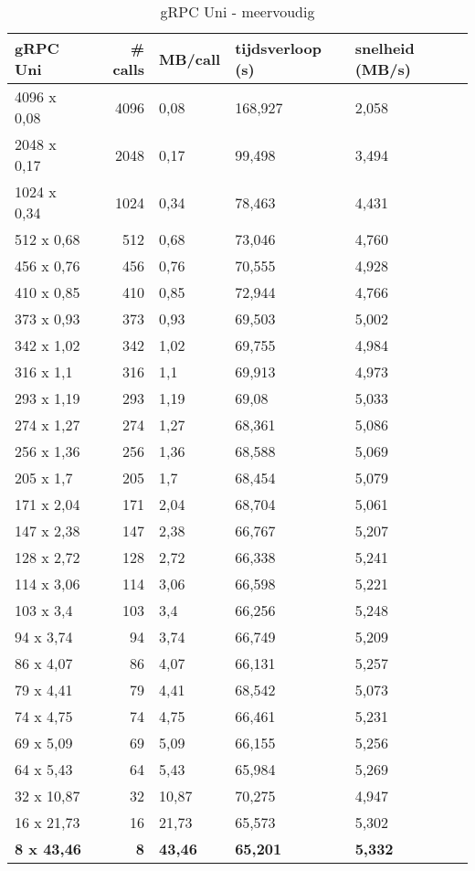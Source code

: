\begin{table}
    \centering
    \begin{tabular}{lrlll}
        \toprule
        \textbf{gRPC Uni} & \textbf{\# calls} & \textbf{MB/call} & \textbf{tijdsverloop (s)} & \textbf{snelheid (MB/s)} \\
        \midrule
        4096 x 0,08 & 4096 & 0,08 & 168,927 & 2,058 \\
        2048 x 0,17 & 2048 & 0,17 & 99,498 & 3,494 \\
        1024 x 0,34 & 1024 & 0,34 & 78,463 & 4,431 \\
        512 x 0,68 & 512 & 0,68 & 73,046 & 4,760 \\
        456 x 0,76 & 456 & 0,76 & 70,555 & 4,928 \\
        410 x 0,85 & 410 & 0,85 & 72,944 & 4,766 \\
        373 x 0,93 & 373 & 0,93 & 69,503 & 5,002 \\
        342 x 1,02 & 342 & 1,02 & 69,755 & 4,984 \\
        316 x 1,1 & 316 & 1,1 & 69,913 & 4,973 \\
        293 x 1,19 & 293 & 1,19 & 69,08 & 5,033 \\
        274 x 1,27 & 274 & 1,27 & 68,361 & 5,086 \\
        256 x 1,36 & 256 & 1,36 & 68,588 & 5,069 \\
        205 x 1,7 & 205 & 1,7 & 68,454 & 5,079 \\
        171 x 2,04 & 171 & 2,04 & 68,704 & 5,061 \\
        147 x 2,38 & 147 & 2,38 & 66,767 & 5,207 \\
        128 x 2,72 & 128 & 2,72 & 66,338 & 5,241 \\
        114 x 3,06 & 114 & 3,06 & 66,598 & 5,221 \\
        103 x 3,4 & 103 & 3,4 & 66,256 & 5,248 \\
        94 x 3,74 & 94 & 3,74 & 66,749 & 5,209 \\
        86 x 4,07 & 86 & 4,07 & 66,131 & 5,257 \\
        79 x 4,41 & 79 & 4,41 & 68,542 & 5,073 \\
        74 x 4,75 & 74 & 4,75 & 66,461 & 5,231 \\
        69 x 5,09 & 69 & 5,09 & 66,155 & 5,256 \\
        64 x 5,43 & 64 & 5,43 & 65,984 & 5,269 \\
        32 x 10,87 & 32 & 10,87 & 70,275 & 4,947 \\
        16 x 21,73 & 16 & 21,73 & 65,573 & 5,302 \\
        \textbf{8 x 43,46} & \textbf{8} & \textbf{43,46} & \textbf{65,201} & \textbf{5,332} \\
        \bottomrule
    \end{tabular}
    \caption{gRPC Uni - meervoudig}
    \label{tab:gRPCUnimeervoudig}
\end{table}

